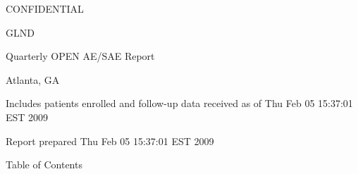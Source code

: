 \documentclass[dvips,10pt]{article}
\begin{document}
\vspace*{1in}
\begin{center}
{\Huge{CONFIDENTIAL}}
\end{center}
\vspace*{0.5in}
\begin{center}
{\Huge{GLND}}
\end{center}
\vspace*{0.25in}
\begin{center}
{\Huge{
Quarterly OPEN AE/SAE Report
}}
\end{center}
\begin{center}
{\Huge{
 
}}
\end{center}
\begin{center}
{\Huge{Atlanta, GA}}
\end{center}
\vspace*{1in}
\begin{center}
\noindent
{\Large{Includes patients enrolled and follow-up data received as of Thu Feb 05 15:37:01 EST 2009}}
\end{center}
\vspace*{0.5in}
\begin{center}
{\Large{Report prepared  Thu Feb 05 15:37:01 EST 2009 }}
\end{center}
\clearpage
\vspace*{1in}
\begin{center}
{\Huge{Table of Contents}}
\end{center}
\listoftables
\listoffigures
\clearpage
\end{document}
